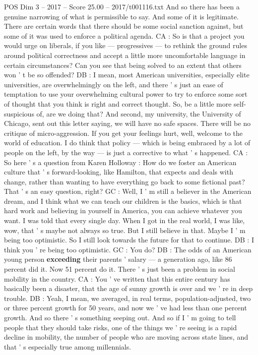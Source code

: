 \begin{textsample}{POS Dim 3 – 2017 – Score 25.00 – 2017/t001116.txt}
And so there has been a genuine narrowing of what is permissible to say.
And some of it is legitimate.
There are certain words that there should be some social sanction against, but some of it was used to enforce a political agenda.
CA : So is that a project you would urge on liberals, if you like — progressives — to rethink the ground rules around political correctness and accept a little more uncomfortable language in certain circumstances?
Can you see that being solved to an extent that others won ' t be so offended?
DB : I mean, most American universities, especially elite universities, are overwhelmingly on the left, and there ' s just an ease of temptation to use your overwhelming cultural power to try to enforce some sort of thought that you think is right and correct thought.
So, be a little more self-suspicious of, are we doing that?
And second, my university, the University of Chicago, sent out this letter saying, we will have no safe spaces.
There will be no critique of micro-aggression.
If you get your feelings hurt, well, welcome to the world of education.
I do think that policy — which is being embraced by a lot of people on the left, by the way — is just a corrective to what ' s happened.
CA : So here ' s a question from Karen Holloway : How do we foster an American culture that ' s forward-looking, like Hamilton, that expects and deals with change, rather than wanting to have everything go back to some fictional past?
That ' s an easy question, right?
GC : Well, I ' m still a believer in the American dream, and I think what we can teach our children is the basics, which is that hard work and believing in yourself in America, you can achieve whatever you want.
I was told that every single day.
When I got in the real world, I was like, wow, that ' s maybe not always so true.
But I still believe in that.
Maybe I ' m being too optimistic.
So I still look towards the future for that to continue.
DB : I think you ' re being too optimistic.
GC : You do?
DB : The odds of an American young person \textbf{exceeding} their parents ' salary — a generation ago, like 86 percent did it.
Now 51 percent do it.
There ' s just been a problem in social mobility in the country.
CA : You ' ve written that this entire century has basically been a disaster, that the age of sunny growth is over and we ' re in deep trouble.
DB : Yeah, I mean, we averaged, in real terms, population-adjusted, two or three percent growth for 50 years, and now we ' ve had less than one percent growth.
And so there ' s something seeping out.
And so if I ' m going to tell people that they should take risks, one of the things we ' re seeing is a rapid decline in mobility, the number of people who are moving across state lines, and that ' s especially true among millennials.

\end{textsample}
